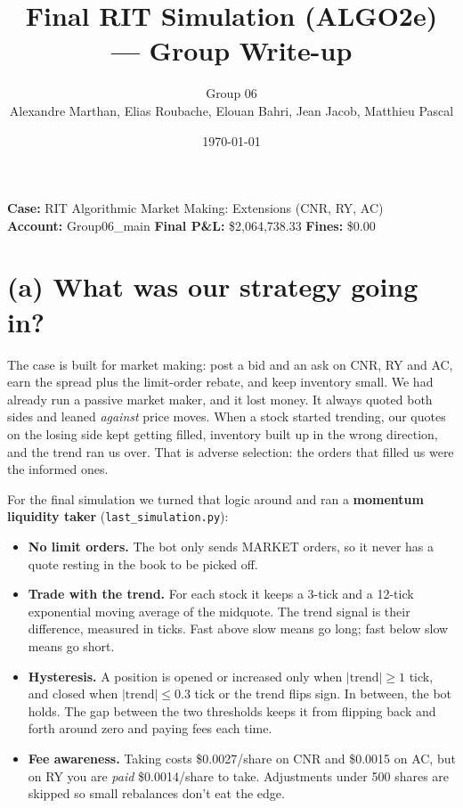 \documentclass[11pt]{article}
\title{\vspace{-2em}Final RIT Simulation (ALGO2e) --- Group Write-up}
\author{Group 06\\ \small Alexandre Marthan, Elias Roubache, Elouan Bahri, Jean Jacob, Matthieu Pascal}
\date{\today}
\begin{document}
\maketitle
\vspace{-1em}

\noindent\textbf{Case:} RIT Algorithmic Market Making: Extensions (CNR, RY, AC) \\
\textbf{Account:} Group06\_main \quad\textbar\quad
\textbf{Final P\&L:} \$2,064,738.33 \quad\textbar\quad
\textbf{Fines:} \$0.00

\section{(a) What was our strategy going in?}

The case is built for market making: post a bid and an ask on CNR, RY and AC,
earn the spread plus the limit-order rebate, and keep inventory small. We had
already run a passive market maker, and it lost money. It always quoted both
sides and leaned \emph{against} price moves. When a stock started trending, our
quotes on the losing side kept getting filled, inventory built up in the wrong
direction, and the trend ran us over. That is adverse selection: the orders that
filled us were the informed ones.

For the final simulation we turned that logic around and ran a \textbf{momentum
liquidity taker} (\texttt{last\_simulation.py}):

\begin{itemize}[leftmargin=1.4em, itemsep=0.2em]
  \item \textbf{No limit orders.} The bot only sends MARKET orders, so it never has
        a quote resting in the book to be picked off.
  \item \textbf{Trade with the trend.} For each stock it keeps a 3-tick and a 12-tick
        exponential moving average of the midquote. The trend signal is their
        difference, measured in ticks. Fast above slow means go long; fast below
        slow means go short.
  \item \textbf{Hysteresis.} A position is opened or increased only when
        $|\text{trend}| \ge 1$ tick, and closed when $|\text{trend}| \le 0.3$ tick or
        the trend flips sign. In between, the bot holds. The gap between the two
        thresholds keeps it from flipping back and forth around zero and paying
        fees each time.
  \item \textbf{Fee awareness.} Taking costs \$0.0027/share on CNR and \$0.0015 on
        AC, but on RY you are \emph{paid} \$0.0014/share to take. Adjustments
        under 500 shares are skipped so small rebalances don't eat the edge.
\end{itemize}
\end{document}
